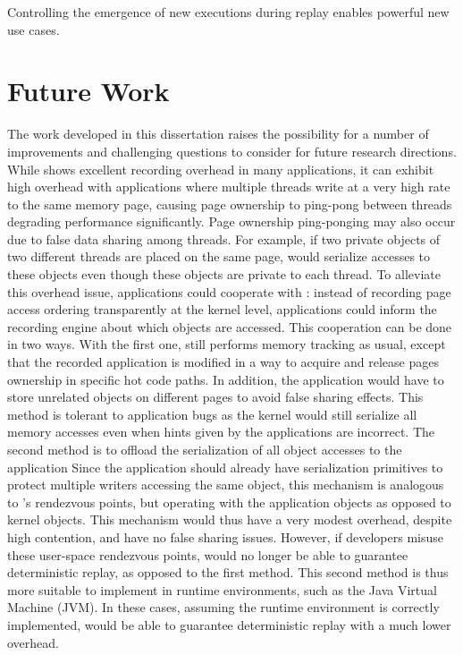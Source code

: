 Controlling the emergence of new executions during replay enables powerful new
use cases.

\section{Future Work}

The work developed in this dissertation raises the possibility for a number of
improvements and challenging questions to consider for future research
directions.
While \scribe shows excellent recording overhead in many applications, it can
exhibit high overhead with applications where multiple threads write at a
very high rate to the same memory page, causing page ownership to ping-pong
between threads degrading performance significantly.
Page ownership ping-ponging may also occur due to false data sharing among
threads. For example, if two private objects of two different threads are placed
on the same page, \scribe would serialize accesses to these objects even though
these objects are private to each thread.
To alleviate this overhead issue, applications could cooperate with \scribe: instead
of recording page access ordering transparently at the kernel level,
applications could inform the recording engine about which objects are accessed.
This cooperation can be done in two ways. With the first one,
\scribe still performs memory tracking as usual, except that the recorded
application is modified in a way to acquire and release pages ownership in
specific hot code paths. In addition, the application would have to store
unrelated objects on different pages to avoid false sharing effects.
This method is tolerant to application bugs as the kernel would still serialize
all memory accesses even when hints given by the applications are incorrect.
The second method is to offload the serialization of all object accesses to the application
Since the application should already have serialization primitives to protect
multiple writers accessing the same object, this mechanism is analogous to
\scribe's rendezvous points, but operating with the application objects as
opposed to kernel objects. This mechanism would thus have a very modest overhead,
despite high contention, and have no false sharing issues.
However, if developers misuse these user-space
rendezvous points, \scribe would no longer be able to guarantee deterministic
replay, as opposed to the first method. This second method is thus more suitable
to implement in runtime environments, such as the Java Virtual Machine (JVM).  In
these cases, assuming the runtime environment is correctly implemented, \scribe
would be able to guarantee deterministic replay with a much lower overhead.

